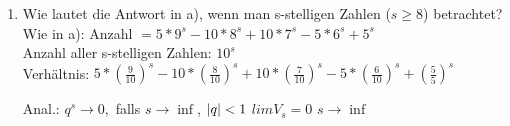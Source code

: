 \begin{enumerate}
		
	(ungefähr) $97\%$ aller 8-stell. Zahlen enthalten nicht alle ungeraden Ziffern.
		
	\item Wie lautet die Antwort in a), wenn man s-stelligen Zahlen ($s\geq 8$) betrachtet?\\	
	Wie in a): Anzahl $= 5*9^s-10*8^s+10*7^s-5*6^s+5^s$\\
		
	Anzahl aller s-stelligen Zahlen: $10^s$\\
		
	Verhältnis: $5*(\frac{9}{10})^s-10*(\frac{8}{10})^s+10*(\frac{7}{10})^s-5*(\frac{6}{10})^s+(\frac{5}{5})^s$
		
	Anal.: $q^s \rightarrow 0,$ falls $s \rightarrow \inf$, $\left|q\right|<1$
	$lim V_s = 0$
	$s\rightarrow \inf$  
\end{enumerate}
                             


















